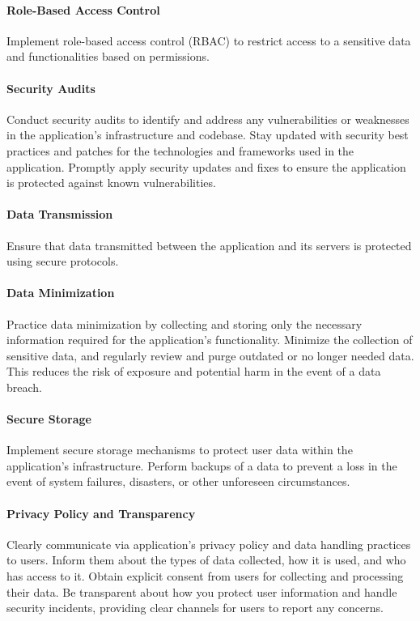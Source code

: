 \paragraph{Role-Based Access Control}
Implement role-based access control (RBAC) to restrict access to a sensitive data and functionalities based on 
permissions.

\paragraph{Security Audits}
Conduct security audits to identify and address any vulnerabilities or weaknesses in the application's infrastructure 
and codebase. Stay updated with security best practices and patches for the technologies and frameworks used in the 
application. Promptly apply security updates and fixes to ensure the application is protected against known 
vulnerabilities.

\paragraph{Data Transmission}
Ensure that data transmitted between the application and its servers is protected using secure protocols. 

\paragraph{Data Minimization}
Practice data minimization by collecting and storing only the necessary information required for 
the application's functionality. Minimize the collection of sensitive data, and regularly review and purge outdated 
or no longer needed data. This reduces the risk of exposure and potential harm in the event of a data breach.

\paragraph{Secure Storage}
Implement secure storage mechanisms to protect user data within the application's infrastructure. Perform backups of a 
data to prevent a loss in the event of system failures, disasters, or other unforeseen circumstances.

\paragraph{Privacy Policy and Transparency}
Clearly communicate via application's privacy policy and data handling practices to users. Inform them about the types 
of data collected, how it is used, and who has access to it. Obtain explicit consent from users for collecting and 
processing their data. Be transparent about how you protect user information and handle security incidents, providing 
clear channels for users to report any concerns.


